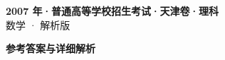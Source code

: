\documentclass[zihao=-4, a4paper]{ctexart}
\begin{document}
\begin{center}
  {\Large\bfseries 2007 年·普通高等学校招生考试·天津卷·理科}\\[4pt]
  {\large 数学 · 解析版}
\end{center}
\medskip
{}

\clearpage
{}
\begin{center}{\Large\bfseries 参考答案与详细解析}\end{center}
\medskip

\end{document}
